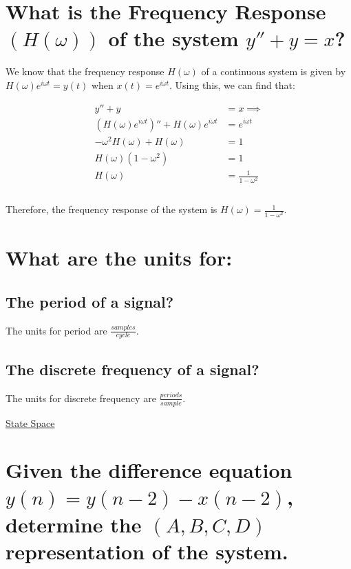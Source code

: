\documentclass{article}
\renewcommand{\thesubsection}{\thesection.\alph{subsection}}
\begin{document}
\section[Question ~\thesection]{What is the Frequency Response $(H(\omega))$ of the system $y'' + y = x$?}

We know that the frequency response $H(\omega)$ of a continuous system is given by $H(\omega)e^{i{\omega}t} = y(t)$ when $x(t) = e^{i{\omega}t}$. Using this, we can find that:

\begin{align*}
	y'' + y &= x \implies \\
	(H(\omega)e^{i{\omega}t})'' + H(\omega)e^{i{\omega}t} &= e^{i{\omega}t} \\
	-{\omega}^2{H(\omega)} + H(\omega) &= 1 \\
	H(\omega)(1 - {\omega}^2) &= 1 \\
	H(\omega) &= \frac{1}{1 - {\omega}^2} \\\\
\end{align*}

Therefore, the frequency response of the system is $H(\omega) = \frac{1}{1 - {\omega}^2}$.

\section[Question ~\thesection]{What are the units for:}

\subsection[~\thesubsection]{The period of a signal?}

The units for period are $\frac{samples}{cycle}$.

\subsection[~\thesubsection]{The discrete frequency of a signal?}

The units for discrete frequency are $\frac{periods}{sample}$.

\newpage

\begin{center}
	\Large{\underline{State Space}}
\end{center}

\section[Question ~\thesection]{Given the difference equation $y(n) = y(n - 2) - x(n - 2)$, determine the $(A, B, C, D)$ representation of the system.}
\end{document}
